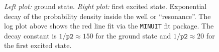 \documentclass[singlepage,notitlepage,nofootinbib,11pt]{revtex4-1}
\begin{document}
\begin{figure}[h]
  \centering
  \captionsetup[subfigure]{labelformat=empty}
  \caption{\label{expoo} {\it Left plot:} ground state. {\it Right plot:} first excited state. Exponential decay of the probability density inside the well or ``resonance''. The log plot above shows the red line fit via the \texttt{MINUIT} fit package. The decay constant is $1/\texttt{p2}\approx150$ for the ground state and $1/\texttt{p2}\approx20$ for the first excited state.}
\end{figure}

\clearpage
\end{document}
